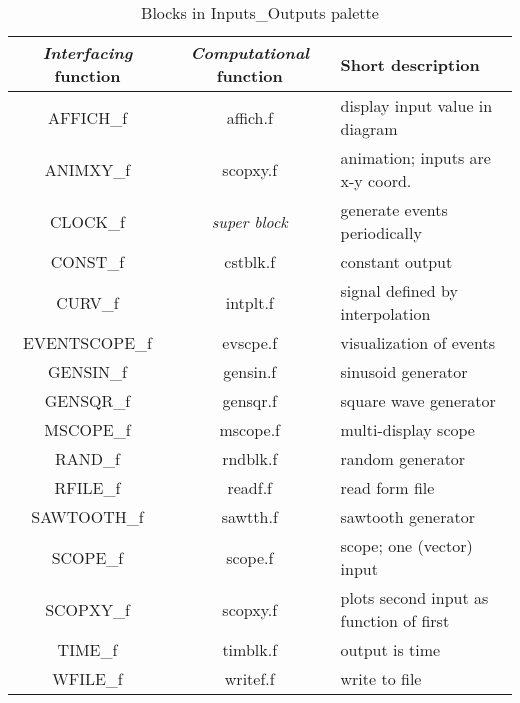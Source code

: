 \documentclass{book}
\newcommand{\computational}{{\em Computational }}
\newcommand{\interfacing}{{\em Interfacing }}
\begin{document}
\begin{table}[ht]
\begin{center}
\begin{tabular}{|c|c|l|} \hline
\interfacing function&\computational function&Short description\\
\hline
AFFICH\_f& affich.f  & display input value in diagram           \\
ANIMXY\_f& scopxy.f          &   animation; inputs are x-y coord.        \\
CLOCK\_f& {\em super block}          &  generate events periodically          \\
CONST\_f& cstblk.f          &   constant output         \\
CURV\_f&  intplt.f         &    signal defined by interpolation       \\
EVENTSCOPE\_f& evscpe.f          &  visualization of events          \\
GENSIN\_f& gensin.f          &   sinusoid generator         \\
GENSQR\_f&  gensqr.f         &  square wave generator          \\
MSCOPE\_f& mscope.f              &  multi-display scope            \\
RAND\_f&  rndblk.f         &  random generator          \\
RFILE\_f& readf.f          &  read form file          \\
SAWTOOTH\_f& sawtth.f          & sawtooth generator           \\
SCOPE\_f& scope.f          &   scope; one (vector) input         \\
SCOPXY\_f& scopxy.f          & plots second input as function of first           \\
TIME\_f&  timblk.f         &  output is time          \\
WFILE\_f& writef.f          & write to file           \\ \hline
\end{tabular}
\end{center}
\caption{Blocks in Inputs\_Outputs palette}
\label{ttt1}
\end{table}
\end{document}
